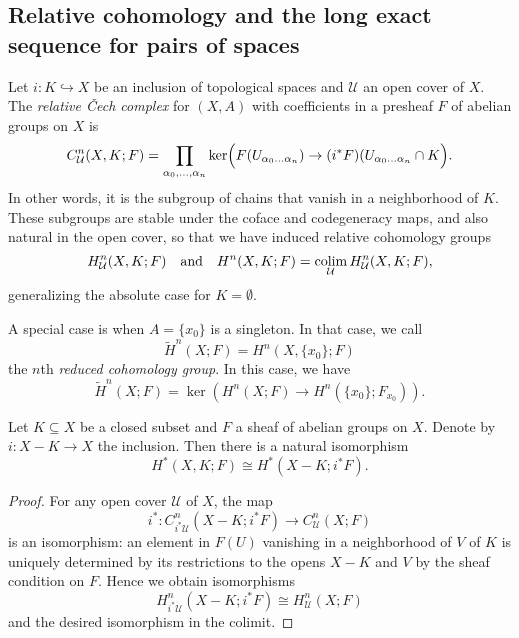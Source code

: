 \documentclass[a4paper,openany]{scrbook}
\begin{document}
\subsection*{Relative cohomology and the long exact sequence for pairs of spaces}

\begin{defn}
Let $i\colon K \hookrightarrow X$ be an inclusion of topological spaces and $\mathcal U$ an open cover of $X$. The \emph{relative \v Cech complex} for $(X,A)$ with coefficients in a presheaf $F$ of abelian groups on $X$ is
\[
C^n_{\mathcal U}(X,K;F) = \prod_{\alpha_0,\dots,\alpha_n} \ker\Bigl(F(U_{\alpha_0\dots\alpha_n}) \to (i^*F)(U_{\alpha_0\dots\alpha_n}\cap K\Bigr).
\]
In other words, it is the subgroup of chains that vanish in a neighborhood of $K$. These subgroups are stable under the coface and codegeneracy maps, and also natural in the open cover, so that we have induced relative cohomology groups
\[
H^n_{\mathcal U}(X,K;F) \quad \text{and} \quad H^n(X,K;F) = \operatorname*{colim}_{\mathcal U} H^n_{\mathcal U}(X,K;F),
\]
generalizing the absolute case for $K=\emptyset$.

A special case is when $A=\{x_0\}$ is a singleton. In that case, we call
\[
\tilde H^n(X;F) = H^n(X,\{x_0\};F)
\]
the $n$th \emph{reduced cohomology group}. In this case, we have
\[
\tilde H^n(X;F) = \ker(H^n(X;F) \to H^n(\{x_0\};F_{x_0})).
\]
\end{defn}

\begin{lemma}\label{lemma:relativecohomology}
Let $K \subseteq X$ be a closed subset and $F$ a sheaf of abelian groups on $X$. Denote by $i\colon X-K \to X$ the inclusion. Then there is a natural isomorphism
\[
H^*(X,K;F) \cong H^*(X-K;i^*F).
\]
\end{lemma}
\begin{proof}
For any open cover $\mathcal U$ of $X$, the map
\[
i^*\colon C^n_{i^*\mathcal U}(X-K;i^*F) \to C^n_{\mathcal U}(X;F)
\]
is an isomorphism: an element in $F(U)$ vanishing in a neighborhood of $V$ of $K$ is uniquely determined by its restrictions to the opens $X-K$ and $V$ by the sheaf condition on $F$. Hence we obtain isomorphisms
\[
H^n_{i^*\mathcal U}(X-K;i^*F) \cong H^n_{\mathcal U}(X;F)
\]
and the desired isomorphism in the colimit.
\end{proof}
\end{document}
